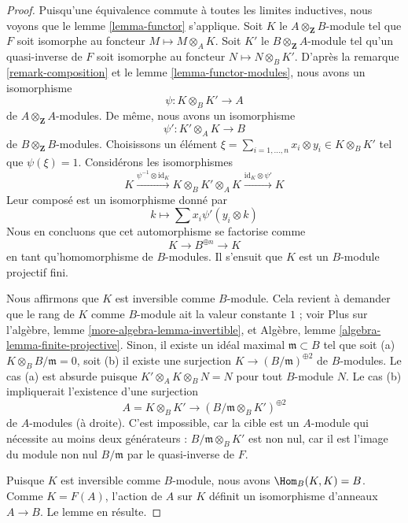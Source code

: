 \begin{proof}
Puisqu'une équivalence commute à toutes les limites inductives, nous voyons que le
lemme \ref{lemma-functor} s'applique. Soit $K$ le
$A \otimes_\mathbf{Z} B$-module tel que $F$ soit
isomorphe au foncteur $M \mapsto M \otimes_A K$.
Soit $K'$ le $B \otimes_\mathbf{Z} A$-module tel qu'un
quasi-inverse de $F$ soit
isomorphe au foncteur $N \mapsto N \otimes_B K'$.
D'après la remarque \ref{remark-composition} et le
lemme \ref{lemma-functor-modules}, nous avons un isomorphisme
$$
\psi : K \otimes_B K' \longrightarrow A
$$
de $A \otimes_\mathbf{Z} A$-modules.
De même, nous avons un isomorphisme
$$
\psi' : K' \otimes_A K \longrightarrow B
$$
de $B \otimes_\mathbf{Z} B$-modules. Choisissons un élément
$\xi = \sum_{i = 1, \ldots, n} x_i \otimes y_i \in K \otimes_B K'$
tel que $\psi(\xi) = 1$. Considérons les isomorphismes
$$
K \xrightarrow{\psi^{-1} \otimes \text{id}_K}
K \otimes_B K' \otimes_A K \xrightarrow{\text{id}_K \otimes \psi'} K
$$
Leur composé est un isomorphisme donné par
$$
k \longmapsto \sum x_i \psi'(y_i \otimes k)
$$
Nous en concluons que cet automorphisme se factorise comme
$$
K \to B^{\oplus n} \to K
$$
en tant qu'homomorphisme de $B$-modules. Il s'ensuit que $K$ est un
$B$-module projectif fini.

\medskip\noindent
Nous affirmons que $K$ est inversible comme $B$-module. Cela revient
à demander que le rang de $K$ comme $B$-module ait la valeur constante $1$ ;
voir Plus sur l'algèbre, lemme \ref{more-algebra-lemma-invertible}, et
Algèbre, lemme \ref{algebra-lemma-finite-projective}.
Sinon, il existe un idéal maximal $\mathfrak m \subset B$
tel que soit (a) $K \otimes_B B/\mathfrak m = 0$, soit
(b) il existe une surjection $K \to (B/\mathfrak m)^{\oplus 2}$ de
$B$-modules. Le cas (a) est absurde puisque $K' \otimes_A K \otimes_B N = N$
pour tout $B$-module $N$. Le cas (b) impliquerait l'existence d'une surjection
$$
A = K \otimes_B K' \longrightarrow (B/\mathfrak m \otimes_B K')^{\oplus 2}
$$
de $A$-modules (à droite). C'est impossible, car la cible est un $A$-module
qui nécessite au moins deux générateurs : $B/\mathfrak m \otimes_B K'$
est non nul, car il est l'image du module non nul $B/\mathfrak m$ par
le quasi-inverse de $F$.

\medskip\noindent
Puisque $K$ est inversible comme $B$-module, nous avons $\Hom_B(K, K) = B$.
Comme $K = F(A)$, l'action de $A$ sur $K$ définit un isomorphisme d'anneaux
$A \to B$. Le lemme en résulte.
\end{proof}

